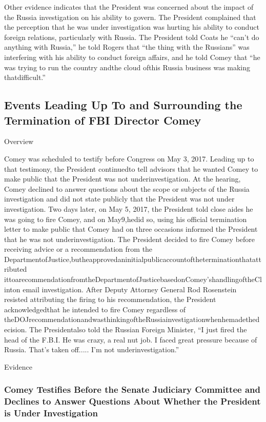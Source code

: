 Other evidence indicates that the President was concerned about the impact of the Russia investigation on his ability to govern. The President complained that the perception that he was under investigation was hurting his ability to conduct foreign relations, particularly with Russia. The President told Coats he “can’t do anything with Russia,” he told Rogers that “the thing with the Russians” was interfering with his ability to conduct foreign affairs, and he told Comey that “he was trying to run the country andthe cloud ofthis Russia business was making thatdifficult.”

\subsection{Events Leading Up To and Surrounding the Termination of FBI Director Comey}

Overview

Comey was scheduled to testify before Congress on May 3, 2017. Leading up to that testimony, the President continuedto tell advisors that he wanted Comey to make public that the President was not underinvestigation. At the hearing, Comey declined to answer questions about the scope or subjects of the Russia investigation and did not state publicly that the President was not under investigation. Two days later, on May 5, 2017, the President told close aides he was going to fire Comey, and on May9,hedid so, using his official termination letter to make public that Comey had on three occasions informed the President that he was not underinvestigation. The President decided to fire Comey before receiving advice or a recommendation from the DepartmentofJustice,butheapprovedaninitialpublicaccountoftheterminationthatattributed ittoarecommendationfromtheDepartmentofJusticebasedonComey’shandlingoftheClinton email investigation. After Deputy Attorney General Rod Rosenstein resisted attributing the firing to his recommendation, the President acknowledgedthat he intended to fire Comey regardless of theDOJrecommendationandwasthinkingoftheRussiainvestigationwhenhemadethedecision. The Presidentalso told the Russian Foreign Minister, “I just fired the head of the F.B.I. He was crazy, a real nut job. I faced great pressure because of Russia. That’s taken off..... I’m not underinvestigation.”

Evidence

\subsubsection{Comey Testifies Before the Senate Judiciary Committee and Declines to Answer Questions About Whether the President is Under Investigation}

